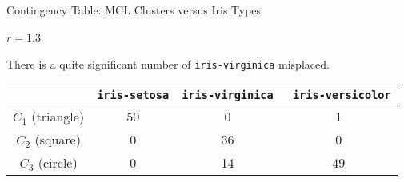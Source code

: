 \begin{frame}{Contingency Table: MCL Clusters versus Iris Types}
  \framesubtitle{$r=1.3$}

	There is a quite significant number of \texttt{iris-virginica} misplaced.

	\medskip

\renewcommand{\arraystretch}{1.1}
\begin{center}
\begin{tabular}{|c|c|c|c|}
        \hline
         & {\tt iris-setosa} & {\tt iris-virginica} & {\tt
         iris-versicolor}\\
         \hline
        $C_1$ (triangle) & 50 & 0 & 1\\
        $C_2$ (square) & 0 & 36 & 0\\
        $C_3$ (circle) & 0 & 14 & 49 \\
        \hline
    \end{tabular}
\end{center}
\end{frame}
